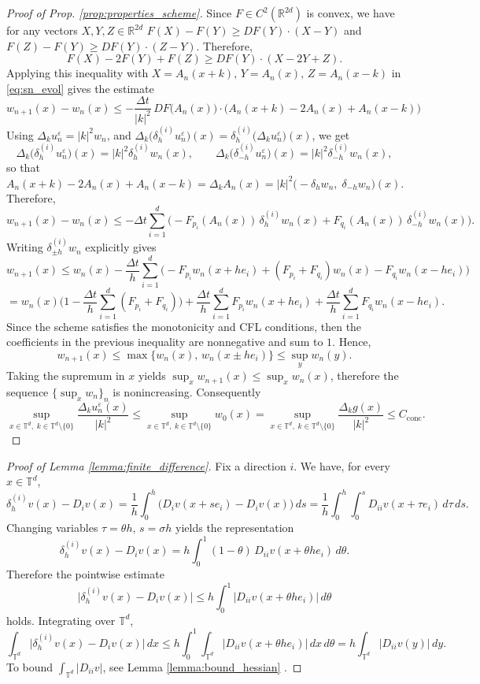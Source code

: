 \documentclass[11pt]{amsart}
\theoremstyle{remark}
\theoremstyle{definition}
\theoremstyle{Claim}
\newcommand{\T}{{\mathbb{T}}}
\theoremstyle{plain}
\begin{document}
\begin{proof}[Proof of Prop. \ref{prop:properties_scheme}]
	Since \(F\in C^2(\mathbb R^{2d})\) is convex, we have for any vectors \(X,Y,Z\in\mathbb R^{2d}\) \(F(X)-F(Y)\ge D F(Y)\cdot (X-Y)\) and \(F(Z)-F(Y)\ge D F(Y)\cdot (Z-Y)\). Therefore,
	\[
	F(X)-2F(Y)+F(Z)\ge D F(Y)\cdot (X-2Y+Z).
	\]
	Applying this inequality with
	\(X=A_n(x+k),\,Y=A_n(x),\,Z=A_n(x-k)\) in \eqref{eq:sn_evol} gives the estimate
	\[
		w_{n+1}(x)-w_n(x)
		\le -\frac{\Delta t}{|k|^2}\,D F\big(A_n(x)\big)\cdot\big(A_n(x+k)-2A_n(x)+A_n(x-k)\big)\]
Using \(\Delta_k u_n^\varepsilon=|k|^2 w_n\), and \(
\Delta_k\big(\delta^{(i)}_h u_n^\varepsilon\big)(x)
= \delta^{(i)}_h\big(\Delta_k u_n^\varepsilon\big)(x)
\), we get
\[
\Delta_k\big(\delta^{(i)}_h u_n^\varepsilon\big)(x)
=|k|^2\delta^{(i)}_h w_n(x),\qquad
\Delta_k\big(\delta^{(i)}_{-h} u_n^\varepsilon\big)(x)=|k|^2\delta^{(i)}_{-h} w_n(x),
\]
so that
\[
A_n(x+k)-2A_n(x)+A_n(x-k)=\Delta_k A_n(x)=|k|^2\big(-\delta_h w_n,\;\delta_{-h} w_n\big)(x).
\]
Therefore,
\[
w_{n+1}(x)-w_n(x)
\le -\Delta t\sum_{i=1}^d\big(-F_{p_i}(A_n(x))\,\delta^{(i)}_h w_n(x)
+F_{q_i}(A_n(x))\,\delta^{(i)}_{-h} w_n(x)\big).
\]
Writing \(\delta^{(i)}_{\pm h}w_n\) explicitly gives
\[
w_{n+1}(x)
\le w_n(x) -\frac{\Delta t}{h}\sum_{i=1}^d\Big(-F_{p_i}w_n(x+h e_i)+(F_{p_i}+F_{q_i})w_n(x)-F_{q_i}w_n(x-h e_i)\Big)
\]
\[
=w_n(x)\bigg(1 -\frac{\Delta t}{h}\sum_{i=1}^d(F_{p_i}+F_{q_i})\bigg)+\frac{\Delta t}{h}\sum_{i=1}^dF_{p_i}w_n(x+h e_i) +\frac{\Delta t}{h}\sum_{i=1}^dF_{q_i}w_n(x-h e_i).
\]
Since the scheme satisfies the monotonicity and CFL conditions, then the coefficients in the previous inequality are nonnegative and sum to $1$. Hence,
\[
w_{n+1}(x)\le\max\{w_n(x),\,w_n(x\pm h e_i)\}\le\sup_{y} w_n(y).
\]
Taking the supremum in $x$ yields $\sup_x w_{n+1}(x)\le\sup_x w_n(x)$, therefore the sequence $\{\sup_x w_n\}_n$ is nonincreasing. Consequently
\[
\sup_{x\in\T^d,\;k\in\T^d\setminus\{0\}}\frac{\Delta_k u_n^\varepsilon(x)}{|k|^2}
\le \sup_{x\in\T^d,\;k\in\T^d\setminus\{0\}} w_0(x)
= \sup_{x\in\T^d,\;k\in\T^d\setminus\{0\}}\frac{\Delta_k g(x)}{|k|^2}
\le C_{\mathrm{conc}}.
\]
\end{proof}
\begin{proof}[Proof of Lemma \ref{lemma:finite_difference}]
	Fix a direction \(i\). We have, for every \(x\in\T^d\),
	\[
	\delta_{h}^{(i)} v(x) - D_i v(x)
	= \frac{1}{h}\int_0^h\big(D_i v(x+s e_i)-D_i v(x)\big)\,ds
	= \frac{1}{h}\int_0^h\int_0^s D_{ii} v(x+\tau e_i)\,d\tau\,ds.
	\]
	Changing variables $\tau=\theta h$, $s=\sigma h$ yields the representation
	\[
	\delta_{h}^{(i)} v(x) - D_i v(x)
	= h\int_0^1 (1-\theta)\,D_{ii} v(x+\theta h e_i)\,d\theta.
	\]
	Therefore the pointwise estimate
	\[
	\big|\delta_{h}^{(i)} v(x) - D_i v(x)\big|
	\le h\int_0^1 \big|D_{ii} v(x+\theta h e_i)\big|\,d\theta
	\]
	holds. Integrating over \(\T^d\),
	\[
	\int_{\T^d}\big|\delta_{h}^{(i)} v(x) - D_i v(x)\big|\,dx
	\le h\int_0^1\int_{\T^d}\big|D_{ii} v(x+\theta h e_i)\big|\,dx\,d\theta
	= h\int_{\T^d}\big|D_{ii} v(y)\big|\,dy.
	\]
	To bound $\int_{\T^d}|D_{ii} v|$, see Lemma \ref{lemma:bound_hessian} .
\end{proof}
\end{document}
